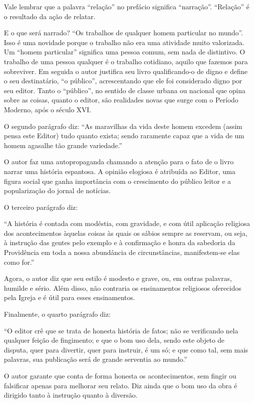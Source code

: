 \documentclass[12pt]{extarticle}
\begin{document}
Vale lembrar que a palavra ``relação'' no prefácio significa
``narração''. ``Relação'' é o resultado da ação de relatar.

E o que será narrado? ``Os trabalhos de qualquer homem particular no
mundo''. Isso é uma novidade porque o trabalho não era uma atividade
muito valorizada. Um ``homem particular'' significa uma pessoa comum,
sem nada de distintivo. O trabalho de uma pessoa qualquer é o trabalho
cotidiano, aquilo que fazemos para sobreviver. Em seguida o autor
justifica seu livro qualificando-o de digno e define o seu destinatário,
``o público'', acrescentando que ele foi considerado digno por seu
editor. Tanto o ``público'', no sentido de classe urbana ou nacional que
opina sobre as coisas, quanto o editor, são realidades novas que surge
com o Período Moderno, após o século XVI.

O segundo parágrafo diz: ``As maravilhas da vida deste homem excedem
(assim pensa este Editor) tudo quanto exista; sendo raramente capaz que
a vida de um homem agasalhe tão grande variedade.''

O autor faz uma autopropaganda chamando a atenção para o fato de o livro
narrar uma história espantosa. A opinião elogiosa é atribuída ao Editor,
uma figura social que ganha importância com o crescimento do público
leitor e a popularização do jornal de notícias.

O terceiro parágrafo diz:

``A história é contada com modéstia, com gravidade, e com útil aplicação
religiosa dos acontecimentos àquelas coisas às quais os sábios sempre as
reservam, ou seja, à instrução das gentes pelo exemplo e à confirmação e
honra da sabedoria da Providência em toda a nossa abundância de
circunstâncias, manifestem-se elas como for.''

Agora, o autor diz que seu estilo é modesto e grave, ou, em outras
palavras, humilde e sério. Além disso, não contraria os ensinamentos
religiosos oferecidos pela Igreja e é útil para esses ensinamentos.

Finalmente, o quarto parágrafo diz:

``O editor crê que se trata de honesta história de fatos; não se
verificando nela qualquer feição de fingimento; e que o bom uso dela,
sendo este objeto de disputa, quer para divertir, quer para instruir, é
um só; e que como tal, sem mais palavras, sua publicação será de grande
serventia ao mundo.''

O autor garante que conta de forma honesta os acontecimentos, sem fingir
ou falsificar apenas para melhorar seu relato. Diz ainda que o bom uso
da obra é dirigido tanto à instrução quanto à diversão.
\end{document}
